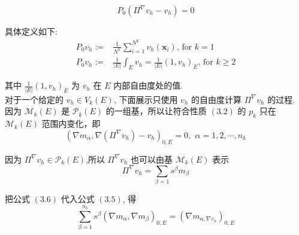     \begin{equation}
    P_0(\Pi^\nabla v_h - v_h) = 0
    \end{equation}
    
    具体定义如下: \\
    \begin{equation}
    \begin{aligned}
    P_0 v_h :=& \frac{1}{N^V}\sum_{i=1}^{N^V} v_h(\mathbf x_i)\text{, for } k=1 \\
    P_0 v_h :=& \frac{1}{|E|} \int_{E}v_h = \frac{1}{|E|} (1, v_h)_E\text{, for } k\geq 2
    \end{aligned}
    \end{equation}
    
    其中 $\frac{1}{|E|} (1, v_h)_E$ 为 $v_h$ 在 $E$ 内部自由度处的值.\\
    
    对于一个给定的 $v_h \in V_k(E)$, 下面展示只使用 $v_h$ 的自由度计算 $\Pi^{\nabla}v_h$ 的过程. \\
    
    因为 $\mathcal M _k(E)$ 是 $\mathcal P_k(E)$ 的一组基，所以让符合性质 $(3.2)$ 的 $p_k$ 只在 $\mathcal M _k(E)$ 范围内变化，即 \\
    \begin{equation}
    (\nabla m_{\alpha}, \nabla(\Pi^{\nabla}v_h) - v_h)_{0,E} = 0,\,\ \alpha = 1,2,\cdots, n_k
    \end{equation}
    
    因为 $\Pi^{\nabla}v_h \in \mathcal P_k(E)$,所以 $\Pi^{\nabla}v_h$ 也可以由基 $\mathcal M_k(E)$ 表示\\
    \begin{equation}
    \Pi^\nabla v_h = \sum_{\beta = 1}s^{\beta}m_\beta
    \end{equation}
    
    把公式 $(3.6)$ 代入公式 $(3.5)$, 得 \\
    \begin{equation}
    \sum_{\beta = 1}^{n_k}s^{\beta}(\nabla m_{\alpha},\nabla m_{\beta})_{0,E} = (\nabla m_{\alpha, \nabla v_h})_{0,E}
    \end{equation}
    
